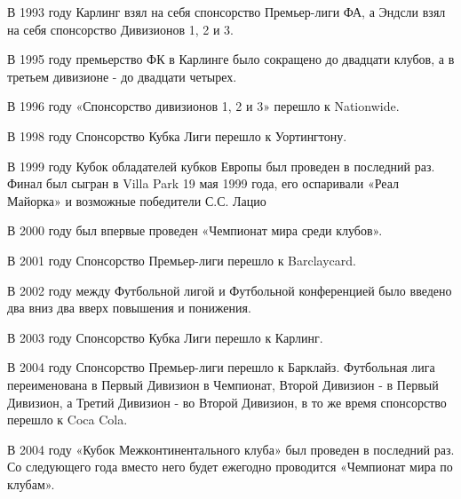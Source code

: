 В 1993 году Карлинг взял на себя спонсорство Премьер-лиги ФА, а Эндсли взял на себя спонсорство Дивизионов 1, 2 и 3.

В 1995 году премьерство ФК в Карлинге было сокращено до двадцати клубов, а в третьем дивизионе - до двадцати четырех.

В 1996 году «Спонсорство дивизионов 1, 2 и 3» перешло к Nationwide.

В 1998 году Спонсорство Кубка Лиги перешло к Уортингтону.

В 1999 году Кубок обладателей кубков Европы был проведен в последний раз. Финал был сыгран в Villa Park 19 мая 1999 года, его оспаривали «Реал Майорка» и возможные победители С.С. Лацио

В 2000 году  был впервые проведен «Чемпионат мира среди клубов».

В 2001 году Спонсорство Премьер-лиги перешло к Barclaycard.

В 2002 году между Футбольной лигой и Футбольной конференцией было введено два вниз два вверх повышения и понижения.

В 2003 году Спонсорство Кубка Лиги перешло к Карлинг.

В 2004 году Спонсорство Премьер-лиги перешло к Барклайз. Футбольная лига переименована в Первый Дивизион в Чемпионат, Второй Дивизион - в Первый Дивизион, а Третий Дивизион - во Второй Дивизион, в то же время спонсорство перешло к Coca Cola.

В 2004 году «Кубок Межконтинентального клуба» был проведен в последний раз. Со следующего года вместо него будет ежегодно проводится «Чемпионат мира по клубам». 